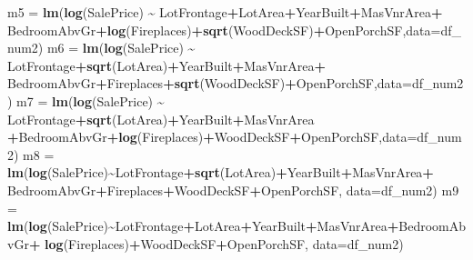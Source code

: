 \documentclass[
]{article}
\newenvironment{Shaded}{\begin{snugshade}}{\end{snugshade}}
\newcommand{\AttributeTok}[1]{\textcolor[rgb]{0.13,0.29,0.53}{#1}}
\newcommand{\FunctionTok}[1]{\textcolor[rgb]{0.13,0.29,0.53}{\textbf{#1}}}
\newcommand{\NormalTok}[1]{#1}
\newcommand{\OtherTok}[1]{\textcolor[rgb]{0.56,0.35,0.01}{#1}}
\newcommand{\SpecialCharTok}[1]{\textcolor[rgb]{0.81,0.36,0.00}{\textbf{#1}}}
\begin{document}
\begin{Shaded}
\begin{Highlighting}[]
\NormalTok{m5 }\OtherTok{=} \FunctionTok{lm}\NormalTok{(}\FunctionTok{log}\NormalTok{(SalePrice) }\SpecialCharTok{\textasciitilde{}}\NormalTok{ LotFrontage}\SpecialCharTok{+}\NormalTok{LotArea}\SpecialCharTok{+}\NormalTok{YearBuilt}\SpecialCharTok{+}\NormalTok{MasVnrArea}\SpecialCharTok{+}
\NormalTok{          BedroomAbvGr}\SpecialCharTok{+}\FunctionTok{log}\NormalTok{(Fireplaces)}\SpecialCharTok{+}\FunctionTok{sqrt}\NormalTok{(WoodDeckSF)}\SpecialCharTok{+}\NormalTok{OpenPorchSF,}\AttributeTok{data=}\NormalTok{df\_num2)}
\NormalTok{m6 }\OtherTok{=} \FunctionTok{lm}\NormalTok{(}\FunctionTok{log}\NormalTok{(SalePrice) }\SpecialCharTok{\textasciitilde{}}\NormalTok{ LotFrontage}\SpecialCharTok{+}\FunctionTok{sqrt}\NormalTok{(LotArea)}\SpecialCharTok{+}\NormalTok{YearBuilt}\SpecialCharTok{+}\NormalTok{MasVnrArea}\SpecialCharTok{+}
\NormalTok{          BedroomAbvGr}\SpecialCharTok{+}\NormalTok{Fireplaces}\SpecialCharTok{+}\FunctionTok{sqrt}\NormalTok{(WoodDeckSF)}\SpecialCharTok{+}\NormalTok{OpenPorchSF,}\AttributeTok{data=}\NormalTok{df\_num2)}
\NormalTok{m7 }\OtherTok{=} \FunctionTok{lm}\NormalTok{(}\FunctionTok{log}\NormalTok{(SalePrice) }\SpecialCharTok{\textasciitilde{}}\NormalTok{ LotFrontage}\SpecialCharTok{+}\FunctionTok{sqrt}\NormalTok{(LotArea)}\SpecialCharTok{+}\NormalTok{YearBuilt}\SpecialCharTok{+}\NormalTok{MasVnrArea}
        \SpecialCharTok{+}\NormalTok{BedroomAbvGr}\SpecialCharTok{+}\FunctionTok{log}\NormalTok{(Fireplaces)}\SpecialCharTok{+}\NormalTok{WoodDeckSF}\SpecialCharTok{+}\NormalTok{OpenPorchSF,}\AttributeTok{data=}\NormalTok{df\_num2)}
\NormalTok{m8 }\OtherTok{=} \FunctionTok{lm}\NormalTok{(}\FunctionTok{log}\NormalTok{(SalePrice)}\SpecialCharTok{\textasciitilde{}}\NormalTok{LotFrontage}\SpecialCharTok{+}\FunctionTok{sqrt}\NormalTok{(LotArea)}\SpecialCharTok{+}\NormalTok{YearBuilt}\SpecialCharTok{+}\NormalTok{MasVnrArea}\SpecialCharTok{+}
\NormalTok{          BedroomAbvGr}\SpecialCharTok{+}\NormalTok{Fireplaces}\SpecialCharTok{+}\NormalTok{WoodDeckSF}\SpecialCharTok{+}\NormalTok{OpenPorchSF, }\AttributeTok{data=}\NormalTok{df\_num2)}
\NormalTok{m9 }\OtherTok{=} \FunctionTok{lm}\NormalTok{(}\FunctionTok{log}\NormalTok{(SalePrice)}\SpecialCharTok{\textasciitilde{}}\NormalTok{LotFrontage}\SpecialCharTok{+}\NormalTok{LotArea}\SpecialCharTok{+}\NormalTok{YearBuilt}\SpecialCharTok{+}\NormalTok{MasVnrArea}\SpecialCharTok{+}\NormalTok{BedroomAbvGr}\SpecialCharTok{+}
          \FunctionTok{log}\NormalTok{(Fireplaces)}\SpecialCharTok{+}\NormalTok{WoodDeckSF}\SpecialCharTok{+}\NormalTok{OpenPorchSF, }\AttributeTok{data=}\NormalTok{df\_num2)}

\end{Highlighting}
\end{Shaded}
\end{document}
